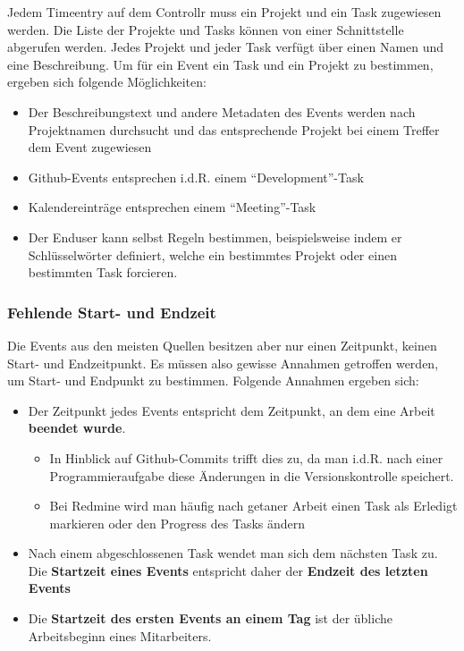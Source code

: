 \documentclass[]{article}
\begin{document}
Jedem Timeentry auf dem Controllr muss ein Projekt und ein Task
zugewiesen werden. Die Liste der Projekte und Tasks können von einer
Schnittstelle abgerufen werden. Jedes Projekt und jeder Task verfügt
über einen Namen und eine Beschreibung. Um für ein Event ein Task und
ein Projekt zu bestimmen, ergeben sich folgende Möglichkeiten:

\begin{itemize}
\itemsep1pt\parskip0pt
\item
  Der Beschreibungstext und andere Metadaten des Events werden nach
  Projektnamen durchsucht und das entsprechende Projekt bei einem
  Treffer dem Event zugewiesen
\item
  Github-Events entsprechen i.d.R. einem ``Development''-Task
\item
  Kalendereinträge entsprechen einem ``Meeting''-Task
\item
  Der Enduser kann selbst Regeln bestimmen, beispielsweise indem er
  Schlüsselwörter definiert, welche ein bestimmtes Projekt oder einen
  bestimmten Task forcieren.
\end{itemize}

\subsubsection{Fehlende Start- und
Endzeit}\label{fehlende-start--und-endzeit}

Die Events aus den meisten Quellen besitzen aber nur einen Zeitpunkt,
keinen Start- und Endzeitpunkt. Es müssen also gewisse Annahmen
getroffen werden, um Start- und Endpunkt zu bestimmen. Folgende Annahmen
ergeben sich:

\begin{itemize}
\itemsep1pt\parskip0pt
\item
  Der Zeitpunkt jedes Events entspricht dem Zeitpunkt, an dem eine
  Arbeit \textbf{beendet wurde}.

  \begin{itemize}
  \itemsep1pt\parskip0pt
  \item
    In Hinblick auf Github-Commits trifft dies zu, da man i.d.R. nach
    einer Programmieraufgabe diese Änderungen in die Versionskontrolle
    speichert.
  \item
    Bei Redmine wird man häufig nach getaner Arbeit einen Task als
    Erledigt markieren oder den Progress des Tasks ändern
  \end{itemize}
\item
  Nach einem abgeschlossenen Task wendet man sich dem nächsten Task zu.
  Die \textbf{Startzeit eines Events} entspricht daher der
  \textbf{Endzeit des letzten Events}
\item
  Die \textbf{Startzeit des ersten Events an einem Tag} ist der übliche
  Arbeitsbeginn eines Mitarbeiters.
\end{itemize}
\end{document}
